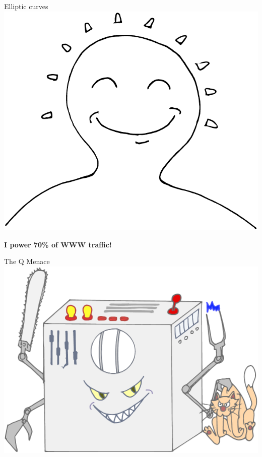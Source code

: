 \documentclass{beamer}
\begin{document}
\begin{frame}{Elliptic curves}
  \transdissolve
  \centering
  \includegraphics[height=0.7\textheight]{ec-happy}

  \Large\bf I power 70\% of WWW traffic!
\end{frame}


\begin{frame}{The Q Menace}
  \centering
  \includegraphics[height=0.7\textheight]{qc-color}
\end{frame}

\end{document}
